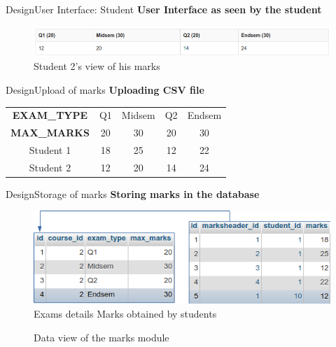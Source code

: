 \documentclass{beamer}
\begin{document}
\begin{frame}{Design}{User Interface: Student}
	\textbf{User Interface as seen by the student}
	\begin{figure}
		\centering
		\includegraphics[width=0.8\linewidth]{media/markss1}
		\caption{Student 2's view of his marks}
		\label{fig:markss1}
	\end{figure}
\end{frame}

\begin{frame}{Design}{Upload of marks}
	\textbf{Uploading CSV file}
	
	\begin{center}
		\bgroup
		\def\arraystretch{1.5}
		\begin{tabular}{ccccc}
			\hline
			\textbf{EXAM\_TYPE} & Q1 & Midsem & Q2 & Endsem \\
			\textbf{MAX\_MARKS} & 20 & 30 & 20 & 30 \\
			Student 1 & 18 & 25 & 12 & 22 \\ 
			Student 2 & 12 & 20 & 14 & 24 \\ 
			\hline 
		\end{tabular}
		\egroup
	\end{center}
		
\end{frame}


\begin{frame}{Design}{Storage of marks}
	\textbf{Storing marks in the database}
	\begin{figure}
		\centering
		\includegraphics[width=0.8\linewidth]{media/marksdb} \\
		\hspace{1.2cm}Exams details \hspace{1.5cm} Marks obtained by students
		\caption{Data view of the marks module}
		\label{fig:marksdb}
	\end{figure}
	
\end{frame}
\end{document}
